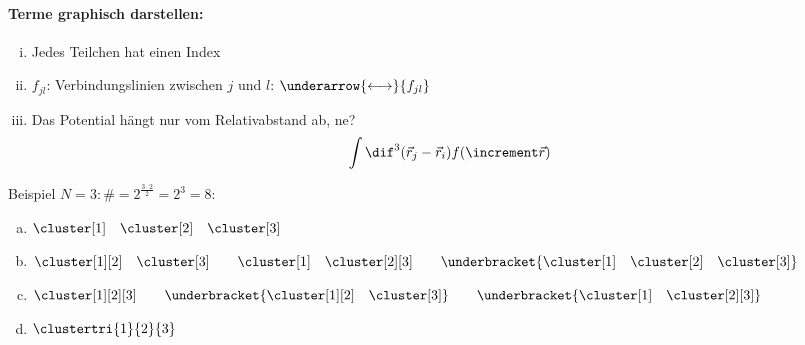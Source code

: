 \paragraph{Terme graphisch darstellen:}
\begin{enumerate}[i)]
    \item Jedes Teilchen hat einen Index 
    \item $f_{jl}$: Verbindungslinien zwischen $j$ und $l$:  $\underarrow{\longleftrightarrow}{f_{jl}}$  
    \item Das Potential hängt nur vom Relativabstand ab, ne?
        \begin{align}
            \int \dif^3 (\vec r_j-\vec r_i) f(\increment \vec r)
        \end{align}
\end{enumerate}

Beispiel $N=3: \# = 2 ^ \frac{3\cdot2}{2} = 2^3 = 8$:


\begin{enumerate}[(a)]
    \item  $\cluster[1] \quad \cluster[2] \quad \cluster[3]$
    \item $\cluster[1][2] \quad \cluster[3] \qquad \cluster[1] \quad \cluster[2][3] \qquad \underbracket{\cluster[1] \quad \cluster[2] \quad \cluster[3]}$
    \item $\cluster[1][2][3] \qquad \underbracket{\cluster[1][2] \quad \cluster[3]} \qquad \underbracket{\cluster[1] \quad \cluster[2][3]}$
    \item $\clustertri{1}{2}{3}$
\end{enumerate}


